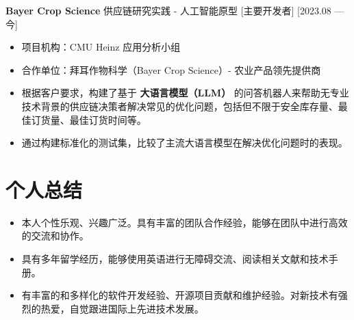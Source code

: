 \documentclass{resume}
\begin{document}
\ResumeItem[Bayer Crop Science]
{\textbf{Bayer Crop Science} 供应链研究实践 - 人工智能原型} %
[主要开发者]
[2023.08 — 今]

\begin{itemize}
  \item 项目机构：CMU Heinz 应用分析小组
  \item 合作单位：拜耳作物科学（Bayer Crop Science）- 农业产品领先提供商
  \item 根据客户要求，构建了基于 \textbf{大语言模型（LLM）} 的问答机器人来帮助无专业技术背景的供应链决策者解决常见的优化问题，包括但不限于安全库存量、最佳订货量、最佳订货时间等。
  \item 通过构建标准化的测试集，比较了主流大语言模型在解决优化问题时的表现。
\end{itemize}

\section{个人总结}

\begin{itemize}
  \item 本人个性乐观、兴趣广泛。具有丰富的团队合作经验，能够在团队中进行高效的交流和协作。
  \item 具有多年留学经历，能够使用英语进行无障碍交流、阅读相关文献和技术手册。
  \item 有丰富的和多样化的软件开发经验、开源项目贡献和维护经验。对新技术有强烈的热爱，自觉跟进国际上先进技术发展。
\end{itemize}
\end{document}

